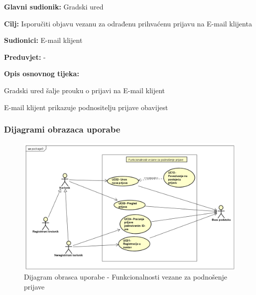 					\noindent {}
					\begin{packed_item}
	
						\item \textbf{Glavni sudionik: }Gradski ured
						\item  \textbf{Cilj:} Isporučiti objavu vezanu za odrađenu prihvaćenu prijavu na E-mail klijenta
						\item  \textbf{Sudionici:} E-mail klijent
						\item  \textbf{Preduvjet:} -
						\item  \textbf{Opis osnovnog tijeka:}
						
						\item[] \begin{packed_enum}
	
							\item Gradski ured šalje prouku o prijavi na E-mail klijent 
							\item E-mail klijent prikazuje podnositelju prijave obavijest
						\end{packed_enum}
						
					\end{packed_item}
						
				
					
				\subsubsection{Dijagrami obrazaca uporabe}
					
					\begin{figure}[H]
			\includegraphics[scale=0.8]{slike/obrazac_podnosenjeprijave.PNG} %
			\centering
			\caption{Dijagram obrasca uporabe - Funkcionalnosti vezane za podnošenje prijave}
		\end{figure}
		
